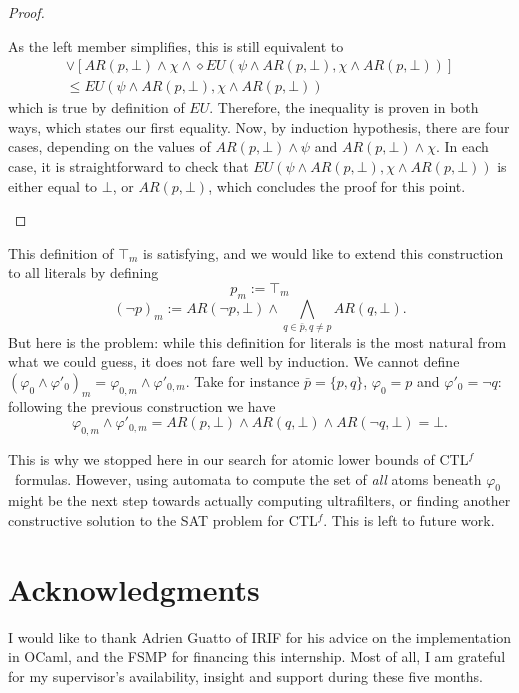 \documentclass[11pt]{article}
\newcommand{\CTLf}{{CTL$^f$}}
\newcommand{\phii}{{\varphi}}
\newcommand{\ARp}{{AR (p,\bot)}}
\theoremstyle{definition}
\begin{document}
\begin{proof}
\begin{itemize}
            As the left member simplifies, this is still equivalent to 
            \begin{multline*}
                [\ARp\wedge\psi]\vee[\ARp\wedge\chi\wedge\diamond EU(\psi\wedge\ARp,\chi\wedge\ARp)]\\
                \leq EU(\psi\wedge\ARp,\chi\wedge\ARp)
            \end{multline*}
            which is true by definition of $EU$. Therefore, the inequality is proven in both ways, which states our first equality.
            Now, by induction hypothesis, there are four cases, depending on the values of $AR(p,\bot)\wedge\psi$ and $AR(p,\bot)\wedge\chi$. In each case, it is straightforward to check that $EU(\psi\wedge AR(p,\bot),\chi\wedge AR(p,\bot))$ is either equal to $\bot$, or $AR(p,\bot)$, which concludes the proof for this point.
    \end{itemize}
\end{proof}


This definition of $\top_m$ is satisfying, and we would like to extend this construction to all literals by defining
 \[p_m:=\top_m\] \[(\neg p)_m:=AR(\neg p,\bot)\wedge\bigwedge_{q\in\bar{p},q\not=p}AR(q,\bot).\] But here is the problem: 
 while this definition for literals is the most natural from what we could guess, it does not fare well by induction. 
 We cannot define $(\varphi_0\wedge\varphi'_0)_m=\varphi_{0,m}\wedge\varphi'_{0,m}$. 
 Take for instance $\bar{p}=\{p,q\}$, $\varphi_0=p$ and $\varphi'_0=\neg q$: following the previous construction we have 
 \[\varphi_{0,m}\wedge\varphi'_{0,m}=AR(p,\bot)\wedge AR(q,\bot)\wedge AR(\neg q,\bot)=\bot.\]

This is why we stopped here in our search for atomic lower bounds of \CTLf~formulas. However, using automata to compute
the set of \emph{all} atoms beneath $\phii_0$ might be the next step towards actually computing ultrafilters, or finding another
constructive solution to the SAT problem for \CTLf. This is left to future work.


\section*{Acknowledgments}
    I would like to thank Adrien Guatto of IRIF for his advice on the implementation in OCaml, and the FSMP for
    financing this internship. Most of all, I am grateful for my supervisor's availability, insight and support 
    during these five months.

\end{document}
